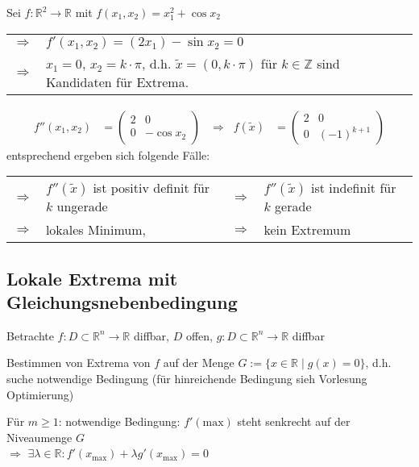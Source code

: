 \begin{example}
	Sei $f:\mathbb{R}^2\to\mathbb{R}$ mit $f(x_1, x_2) = x_1^2 + \cos x_2$ \\
	\begin{tabularx}{\linewidth}{r@{\ \ }X}
	$\Rightarrow$ & $f'(x_1, x_2) = (2x_1) - \sin x_2 = 0$ \\
	$\Rightarrow$  &$x_1 = 0$, $x_2 = k\cdot\pi$, d.h. $\tilde{x} = (0, k\cdot\pi)$ für $k\in\mathbb{Z}$ sind Kandidaten für Extrema.
	\end{tabularx} \begin{align*}
		f''(x_1, x_2) &= \begin{pmatrix}
			2 & 0 \\ 0 & -\cos x_2
		\end{pmatrix} & \Rightarrow\;\; f(\tilde{x}) &= \begin{pmatrix}
			2 & 0 \\ 0 & (-1)^{k+1}
		\end{pmatrix}
	\end{align*}
	entsprechend ergeben sich folgende Fälle:\\
	\begin{tabularx}{\linewidth}{r@{\ \ }Xr@{\ \ }X}
	$\Rightarrow$ & $f''(\tilde{x})$ ist positiv definit für $k$ ungerade & $\Rightarrow$ & $f''(\tilde{x})$ ist indefinit für $k$ gerade \\
	$\Rightarrow$ & lokales Minimum,&
	$\Rightarrow$ & kein Extremum
	\end{tabularx}
\end{example}

\subsection{Lokale Extrema mit Gleichungsnebenbedingung}
Betrachte $f:D\subset\mathbb{R}^n\to\mathbb{R}$ \gls{diffbar}, $D$ offen, $g:D\subset\mathbb{R}^n\to\mathbb{R}$ \gls{diffbar}

\begin{underlinedenvironment}[Frage]
	Bestimmen von Extrema von $f$ auf der Menge $G:= \{ x\in\mathbb{R}\mid g(x) = 0 \}$, d.h. suche notwendige Bedingung (für hinreichende Bedingung sieh Vorlesung Optimierung)
\end{underlinedenvironment}

\begin{underlinedenvironment}[Motivation]
	Für $m\ge 1$: notwendige Bedingung: $f'(\mathrm{max})$ steht senkrecht auf der Niveaumenge $G$  \\
	$\Rightarrow$ $\exists\lambda\in\mathbb{R}: f'(x_{\max}) + \lambda g'(x_{\max}) = 0$
\end{underlinedenvironment}

